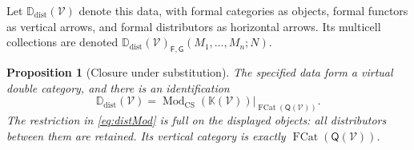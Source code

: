 \documentclass[11pt,reqno]{amsart}
\theoremstyle{plain}
\newtheorem{proposition}[theorem]{Proposition}
\theoremstyle{definition}
\theoremstyle{remark}
\numberwithin{equation}{section}
\newcommand{\V}{\mathcal V}
\newcommand{\Q}{\mathsf Q}
\newcommand{\Kcal}{\mathbb K}
\newcommand{\Ddist}{\mathbb D_{\mathrm{dist}}}
\newcommand{\Mod}{\operatorname{Mod}_{\mathrm{CS}}}
\newcommand{\FCat}{\operatorname{FCat}}
\begin{document}
Let $\Ddist(\V)$ denote this data, with formal categories as objects,
formal functors as vertical arrows, and formal distributors as horizontal
arrows. Its multicell collections are denoted
$\Ddist(\V)_{\mathsf F,\mathsf G}(M_1,\ldots,M_n;N)$.

\begin{proposition}[Closure under substitution]\label{prop:distvirtual}
The specified data form a virtual double category, and there is an
identification
\begin{equation}\label{eq:distMod}
 \Ddist(\V)
 =\left.\Mod(\Kcal(\V))\right|_{\FCat(\Q(\V))}.
\end{equation}
The restriction in \cref{eq:distMod} is full on the displayed objects:
all distributors between them are retained. Its vertical category is
exactly $\FCat(\Q(\V))$.
\end{proposition}
\end{document}
